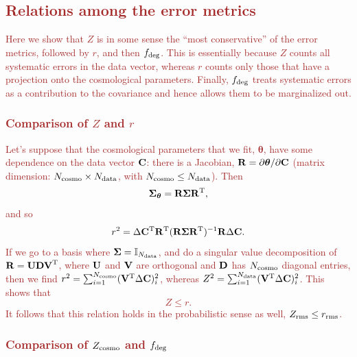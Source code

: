 \documentclass[usenatbib]{mnras}
\newcommand{\changetext}[1]{\textcolor{brown}{#1}}
\begin{document}
\subsection{\changetext{Relations among the error metrics}}

\changetext{Here we show that $Z$ is in some sense the ``most conservative'' of the error metrics, followed by $r$, and then $f_{\rm deg}$. This is essentially because $Z$ counts all systematic errors in the data vector, whereas $r$ counts only those that have a projection onto the cosmological parameters. Finally, $f_{\rm deg}$ treats systematic errors as a contribution to the covariance and hence allows them to be marginalized out.}

\subsubsection{\changetext{Comparison of $Z$ and $r$}}

\changetext{Let's suppose that the cosmological parameters that we fit, ${\boldsymbol\theta}$, have some dependence on the data vector ${\bf C}$: there is a Jacobian, ${\bf R} = \partial {\boldsymbol\theta}/\partial{\bf C}$ (matrix dimension: $N_{\rm cosmo}\times N_{\rm data}$, with $N_{\rm cosmo}\le N_{\rm data}$). Then
\begin{equation}
{\boldsymbol\Sigma}_{\boldsymbol\theta} = {\bf R}{\boldsymbol\Sigma}{\bf R}^{\rm T},
\end{equation}
and so
\begin{equation}
r^2 = \Delta{\bf C}^{\rm T}{\bf R}^{\rm T} ({\bf R}{\boldsymbol\Sigma}{\bf R}^{\rm T})^{-1} {\bf R}\Delta{\bf C}.
\end{equation}
If we go to a basis where ${\boldsymbol\Sigma} = {\mathbb I}_{N_{\rm data}}$, and do a singular value decomposition of ${\bf R} = {\bf UDV}^{\rm T}$, where ${\bf U}$ and ${\bf V}$ are orthogonal and ${\bf D}$ has $N_{\rm cosmo}$ diagonal entries, then we find $r^2 = \sum_{i=1}^{N_{\rm cosmo}} ({\bf V}^{\rm T}\Delta{\bf C})_i^2$, whereas $Z^2 = \sum_{i=1}^{N_{\rm data}} ({\bf V}^{\rm T}\Delta{\bf C})_i^2$. This shows that
\begin{equation}
Z \le r.
\label{eq:ZZC}
\end{equation}
It follows that this relation holds in the probabilistic sense as well, $Z_{\rm rms}\le r_{\rm rms}$.
}

\subsubsection{\changetext{Comparison of $Z_{\rm cosmo}$ and $f_{\rm deg}$}}
\label{ss:czf}
\end{document}
